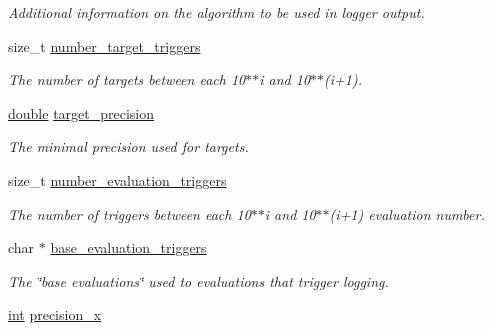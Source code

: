 \begin{DoxyCompactItemize}
\begin{DoxyCompactList}\small\item\em Additional information on the algorithm to be used in logger output. \end{DoxyCompactList}\item 
size\+\_\+t \hyperlink{structcoco__observer__s_aef03bbe3ca381a03ed1eff789c03ab66}{number\+\_\+target\+\_\+triggers}\hypertarget{structcoco__observer__s_aef03bbe3ca381a03ed1eff789c03ab66}{}\label{structcoco__observer__s_aef03bbe3ca381a03ed1eff789c03ab66}

\begin{DoxyCompactList}\small\item\em The number of targets between each 10$\ast$$\ast$i and 10$\ast$$\ast$(i+1). \end{DoxyCompactList}\item 
\hyperlink{classdouble}{double} \hyperlink{structcoco__observer__s_a48b8efaa68fc67c5b4c81b9a5de9d026}{target\+\_\+precision}\hypertarget{structcoco__observer__s_a48b8efaa68fc67c5b4c81b9a5de9d026}{}\label{structcoco__observer__s_a48b8efaa68fc67c5b4c81b9a5de9d026}

\begin{DoxyCompactList}\small\item\em The minimal precision used for targets. \end{DoxyCompactList}\item 
size\+\_\+t \hyperlink{structcoco__observer__s_a82e30870dc411c480b44b21e37b2d570}{number\+\_\+evaluation\+\_\+triggers}\hypertarget{structcoco__observer__s_a82e30870dc411c480b44b21e37b2d570}{}\label{structcoco__observer__s_a82e30870dc411c480b44b21e37b2d570}

\begin{DoxyCompactList}\small\item\em The number of triggers between each 10$\ast$$\ast$i and 10$\ast$$\ast$(i+1) evaluation number. \end{DoxyCompactList}\item 
char $\ast$ \hyperlink{structcoco__observer__s_aa8638b0982f9deae37953709e2881e9e}{base\+\_\+evaluation\+\_\+triggers}\hypertarget{structcoco__observer__s_aa8638b0982f9deae37953709e2881e9e}{}\label{structcoco__observer__s_aa8638b0982f9deae37953709e2881e9e}

\begin{DoxyCompactList}\small\item\em The \char`\"{}base evaluations\char`\"{} used to evaluations that trigger logging. \end{DoxyCompactList}\item 
\hyperlink{classint}{int} \hyperlink{structcoco__observer__s_a66cdd7cba2b73afed919ee5d9bcda69c}{precision\+\_\+x}\hypertarget{structcoco__observer__s_a66cdd7cba2b73afed919ee5d9bcda69c}{}\label{structcoco__observer__s_a66cdd7cba2b73afed919ee5d9bcda69c}


\end{DoxyCompactItemize}
